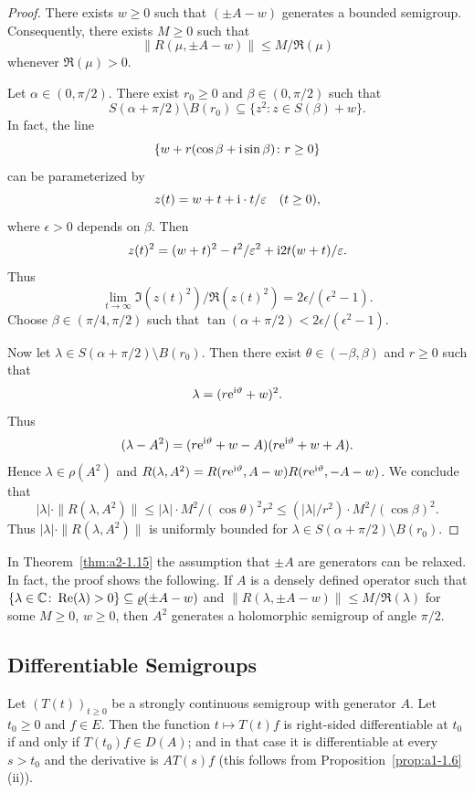 \begin{proof}
There exists $w \geq 0$ such that $(\pm A - w)$ generates a bounded semigroup.
Consequently, there exists $M \geq 0$ such that 
%
\[
	\|R(\mu,\pm A - w)\| \leq M/\Re(\mu)
\]
%
whenever $\Re(\mu) > 0$.

Let $\alpha \in (0,\pi/2)$.
There exist $r_0 \geq 0$ and $\beta \in (0,\pi/2)$ such that
\[
    S(\alpha+\pi/2)\setminus B(r_{0}) \subseteq \{ z^2 \colon z \in S(\beta) + w \}.
\]
In fact, the line 
%
\[
	\{w + r(\cos\beta + \im \sin\beta) \colon r \geq 0\} 
\]
%
can be parameterized by 
%
\[
	 z(t) = w + t + \im\cdot t/\epsilon \quad (t \geq 0) ,
\]
%
where $\epsilon > 0$ depends on $\beta$.
Then 
%
\[
	z(t)^2 = (w + t)^2 - t^2/\epsilon^2 + \im 2t(w+t)/\epsilon .
\]
%
Thus 
%
\[
	\lim_{t \to \infty} \Im(z(t)^2)/\Re(z(t)^2) = 2\epsilon/(\epsilon^2-1) .
\]
%
Choose $\beta \in (\pi/4,\pi/2)$ such that $\tan(\alpha + \pi/2) < 2\epsilon/(\epsilon^2-1)$. 

Now let $\lambda \in S(\alpha+\pi/2)\setminus B(r_{0})$.
Then there exist $\theta \in (-\beta,\beta)$ and $r \geq 0$ such that 
%
\[
	 \lambda = (r\eu^{\im\theta}+w)^2 .
\]
%
Thus %
\[
	(\lambda-A^2) = (r\eu^{\im\theta}+w - A)(r\eu^{\im\theta}+w + A) .
\]
%
Hence $\lambda \in \rho(A^2)$ and $R(\lambda,A^2) = R(r\eu^{\im\theta},A-w)R(r\eu^{\im\theta},-A-w)$.
We conclude that 
\[
|\lambda| \cdot \|R(\lambda,A^2)\| \leq |\lambda| \cdot M^2/(\cos\theta)^2r^2 \leq (|\lambda|/r^2)\cdot M^2/(\cos\beta)^2.
\]
Thus $|\lambda| \cdot \|R(\lambda,A^2)\|$ is uniformly bounded for $\lambda \in S(\alpha+\pi/2) \setminus B(r_0)$.
\end{proof}
\begin{remark*}\label{rem:a2-1.7-kgk}
In Theorem~\ref{thm:a2-1.15}  
the assumption that $\pm A$ are generators can be relaxed.
In fact, the proof shows the following.
If\/ $A$ is a densely defined operator such that 
$\{\lambda \in \C \colon \Re(\lambda) > 0\} \subseteq \rho(\pm A - w)$ and 
$\|R(\lambda,\pm A - w)\| \leq M/\Re(\lambda)$ for some $M \geq 0$, $w \geq 0$, then $A^2$ generates a holomorphic semigroup of angle $\pi/2$.
\end{remark*}

\subsection{Differentiable Semigroups} \label{subsec:a2-1.se5}%
Let $(T(t))_{t\geq 0}$ be a strongly continuous semigroup with generator $A$.
Let $t_0 \geq 0$ and $f \in E$.
Then the function $t \mapsto T(t)f$ is right-sided differentiable at $t_0$ if and only if\/ $T(t_0)f \in D(A)$; and in that case it is differentiable at every $s > t_0$ and the derivative is $AT(s)f$ (this follows from Proposition~\ref{prop:a1-1.6}\,(ii)).

